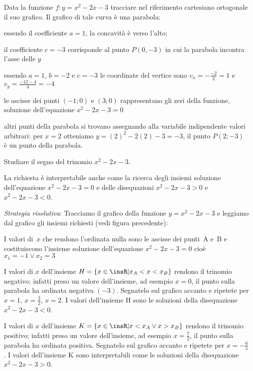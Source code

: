 \begin{exrig}
\begin{esempio}
Data la funzione $f: y=x^2-2x-3$ tracciare nel riferimento cartesiano ortogonale 
il suo grafico.
Il grafico di tale curva è una parabola:
\begin{itemize*}
\item essendo il coefficiente $a=1$, la concavità è verso l'alto;
\item il coefficiente $c=-3$ corrisponde al punto $P(0,-3)$ in cui la parabola 
incontra l'asse delle $y$
\item essendo $ a=1 $, $b=-2$ e $c=-3$ le coordinate del vertice sono 
$v_x=-\frac{-2} 2=1$ e $v_y=\frac{-12-4} 4=-4$
\item le ascisse dei punti $(-1;0)$ e $(3;0)$ rappresentano gli zeri della 
funzione, soluzione dell'equazione $x^2-2x-3=0$
\item altri punti della parabola si trovano assegnando alla variabile 
indipendente valori arbitrari: per $x=2$ otteniamo $y=(2)^2-2(2)-3=-3$, il punto 
$P(2;-3)$ è un punto della parabola.
\end{itemize*}

\begin{center}
 
\end{center}
\end{esempio}
\begin{esempio}
Studiare il segno del trinomio $x^2-2x-3$.

La richiesta è interpretabile anche come la ricerca degli insiemi soluzione 
dell'equazione $x^2-2x-3=0$ e delle disequazioni $x^2-2x-3>0$ e $x^2-2x-3<0$.

\emph{Strategia risolutiva}:
Tracciamo il grafico della funzione $y=x^2-2x-3$ e leggiamo dal grafico gli 
insiemi richiesti (vedi figura precedente):
\begin{itemize*}
\item I valori di~$x$ che rendono l'ordinata nulla sono le ascisse dei punti~A 
e~B e costituiscono l'insieme soluzione dell'equazione $x^2-2x-3=0$ cioè 
$x_1=-1\vee x_2=3$
\item I valori di $x$ dell'insieme $H=\{x\in \insR | x_A<x<x_B\}$ rendono il 
trinomio negativo; infatti preso un valore dell'insieme, ad esempio $x=0$, il 
punto sulla parabola ha ordinata negativa $(-3)$. Segnatelo sul grafico accanto 
e ripetete per $x=1$, $x=\frac 3 2$, $x=2$.
I valori dell'insieme H sono le soluzioni della disequazione $x^2-2x-3<0$.
\item I valori di $x$ dell'insieme $K=\{x\in \insR | x<x_A\vee x>x_B\}$ rendono 
il trinomio positivo; infatti preso un valore dell'insieme, ad esempio $x=\frac 
7 2$, il punto sulla parabola ha ordinata positiva. Segnatelo sul grafico 
accanto e ripetete per $x=-\frac{6}{5}$.
I valori dell'insieme K sono interpretabili come le soluzioni della disequazione 
$x^2-2x-3>0$.
\end{itemize*}
\end{esempio}
\end{exrig}


